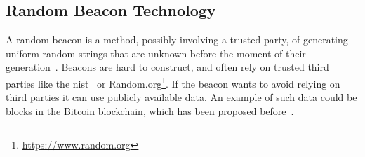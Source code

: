 \subsection{Random Beacon Technology}
A random beacon is a method, possibly involving a trusted party, of generating uniform random strings that are unknown before the moment of their generation~\cite{andrychowicz2014distributed}.
Beacons are hard to construct, and often rely on trusted third parties like the \acrfull{nist}~\cite{nistbeacon} or Random.org\footnote{\url{https://www.random.org}}.
If the beacon wants to avoid relying on third parties it can use publicly available data.
An example of such data could be blocks in the Bitcoin blockchain, which has been proposed before~\cite{bonneau2015bitcoin}.
